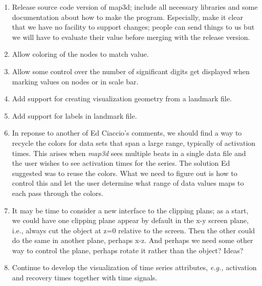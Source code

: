 \documentclass[11pt]{article}
\newcommand{\eg}{{\em e.g.,}}
\newcommand{\map}{\emph{map3d}}
\begin{document}
\begin{enumerate}
  \item Release source code version of map3d; include all necessary
    libraries and some documentation about how to make the program.
    Especially, make it clear that we have no facility to support changes;
    people can send things to us but we will have to evaluate their value
    before merging with the release version.
  \item Allow coloring of the nodes to match value.
  \item Allow some control over the number of significant digits get
    displayed when marking values on nodes or in scale bar.
  \item Add support for creating visualization geometry from a landmark
    file. 
  \item Add support for labels in landmark file.
  \item In reponse to another of Ed Ciaccio's comments, we should find a
    way to recycle the colors for data sets that span a large range,
    typically of activation times.  This arises when \map{} sees
    multiple beats in a single data file and the user wishes to see
    activation times for the series.  The solution Ed suggested was to
    reuse the colors.  What we need to figure out is how to control this
    and let the user determine what range of data values maps to each pass
    through the colors.   
 
  \item It may be time to consider a new interface to the clipping plans;
    as a start, we could have one clipping plane appear by default in the
    x-y screen plane, i.e., always cut the object at z=0 relative to the
    screen.  Then the other could do the same in another plane, perhaps
    x-z.  And perhaps we need some other way to control the plane, perhaps
    rotate it rather than the object?  Ideas?

  \item Continue to develop the visualization of time series attributes,
    \eg{} activation and recovery times together with time signals.


\end{enumerate}
\end{document}
